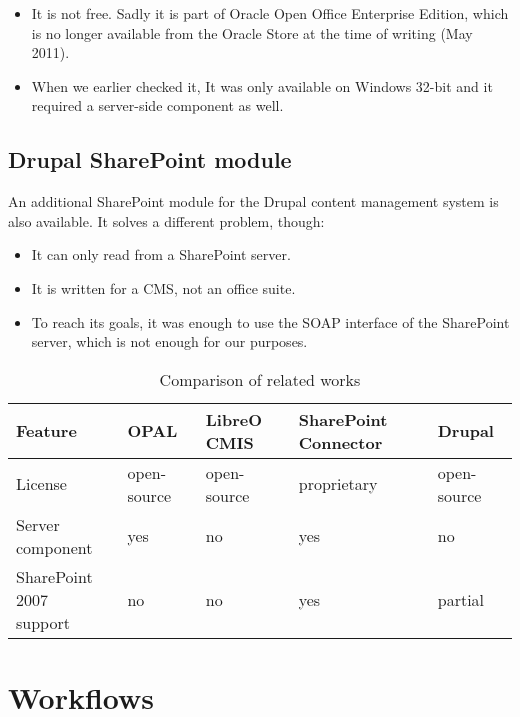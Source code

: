 \begin{itemize}
\item It is not free. Sadly it is part of Oracle Open Office Enterprise
Edition, which is no longer available from the Oracle Store at the time of
writing (May 2011).
\item When we earlier checked it, It was only available on Windows 32-bit and it
required a server-side component as well.
\end{itemize}

\subsection*{Drupal SharePoint module}

An additional SharePoint module\cite{drupal-sp} for the Drupal content management system is also available. It solves a different problem, though:

\begin{itemize}
\item It can only read from a SharePoint server.
\item It is written for a CMS, not an office suite.
\item To reach its goals, it was enough to use the SOAP interface of the
SharePoint server, which is not enough for our purposes.
\end{itemize}

\begin{table}[H]
  \begin{center}
    \begin{tabular}{| l | l | l | l | l |}
    \hline
    \textbf{Feature} & \textbf{OPAL} & \textbf{LibreO CMIS} & \textbf{SharePoint Connector} & \textbf{Drupal} \\ \hline
    License & open-source & open-source & proprietary & open-source \\ \hline
    Server component & yes & no & yes & no \\ \hline
    \makecell[l]{SharePoint 2007 \\ support} & no & no & yes & partial \\ \hline
    \end{tabular}
  \end{center}
  \caption{Comparison of related works}
  \label{tab:related-cmp}
\end{table}

\section{Workflows}

